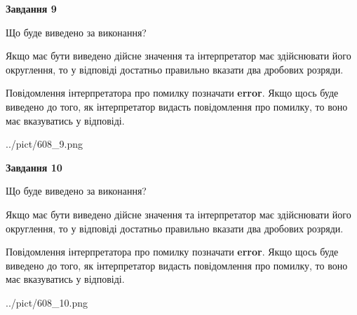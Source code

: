 \documentclass[12pt, ukrainian]{article}
\begin{document}
{\begin {Large}
{\begin {center}\textbf{Завдання 9}\end {center}}\par
Що буде виведено за виконання? \par

Якщо має бути виведено дійсне значення та інтерпретатор має здійснювати його округлення, 
то у відповіді достатньо правильно вказати два дробових розряди.

Повідомлення інтерпретатора про помилку позначати \textbf{error}.
Якщо щось буде виведено до того, як інтерпретатор видасть повідомлення про помилку, 
то воно має вказуватись у відповіді. \par

\begin{center}
	{../pict/608_9.png}
\end{center}
\newpage

{\begin {center}\textbf{Завдання 10}\end {center}}\par
Що буде виведено за виконання? \par

Якщо має бути виведено дійсне значення та інтерпретатор має здійснювати його округлення, 
то у відповіді достатньо правильно вказати два дробових розряди.

Повідомлення інтерпретатора про помилку позначати \textbf{error}.
Якщо щось буде виведено до того, як інтерпретатор видасть повідомлення про помилку, 
то воно має вказуватись у відповіді. \par

\begin{center}
	{../pict/608_10.png}
\end{center}
\newpage

\end {Large}}
\end{document}
